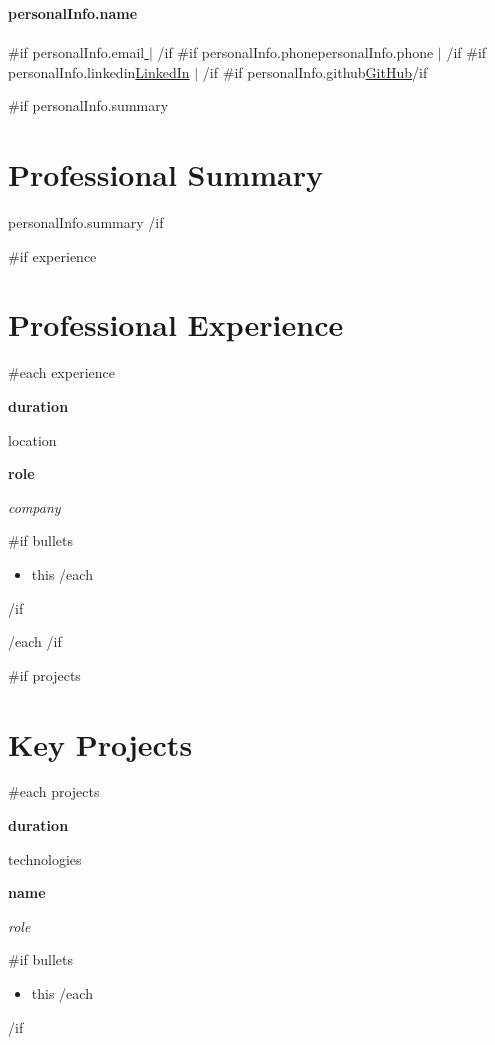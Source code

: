 \documentclass[11pt, a4paper]{article}
\newcommand{\timelineEntry}[4]{
    \noindent
    \begin{minipage}[t]{0.18\textwidth}
        \vspace{0pt} %
        \textcolor{secondary}{\small\textbf{#1}}\par
        \vspace{2pt}
        \textcolor{secondary}{\footnotesize #2}
    \end{minipage}%
    \hfill
    \begin{minipage}[t]{0.79\textwidth}
        \vspace{0pt}
        \textbf{\large\color{primary}#3}\par
        \vspace{2pt}
        \textit{\color{secondary}#4}\par
    \end{minipage}
}
\begin{document}
\pagestyle{empty}

\begin{center}
    {\Huge \bfseries \color{primary} {{{personalInfo.name}}} }\\[6pt]
    \textcolor{secondary}{\large }\\[6pt]
    \small
    {{#if personalInfo.email}}\href{mailto:{{{personalInfo.email}}} }{ } $\vert$ {{/if}}
    {{#if personalInfo.phone}}{{{personalInfo.phone}}} $\vert$ {{/if}}
    {{#if personalInfo.linkedin}}\href{ {{{personalInfo.linkedin}}} }{\color{accent}LinkedIn} $\vert$ {{/if}}
    {{#if personalInfo.github}}\href{ {{{personalInfo.github}}} }{\color{accent}GitHub}{{/if}}
\end{center}

\vspace{12pt}

{{#if personalInfo.summary}}
\section*{Professional Summary}
\noindent
\textcolor{primary}{ {{{personalInfo.summary}}} }
{{/if}}

{{#if experience}}
\section*{Professional Experience}

{{#each experience}}
\timelineEntry{ {{{duration}}} }{ {{{location}}} }
{ {{{role}}} }{ {{{company}}} }
{{#if bullets}}
\vspace{-6pt}
\hfill
\begin{minipage}[t]{0.79\textwidth}
\begin{itemize}[leftmargin=1.2em, noitemsep, topsep=0pt]
{{#each bullets}}
    \item {{{this}}}
{{/each}}
\end{itemize}
\end{minipage}
{{/if}}
\par\vspace{10pt}

{{/each}}
{{/if}}

{{#if projects}}
\section*{Key Projects}

{{#each projects}}
\timelineEntry{ {{{duration}}} }{ {{{technologies}}} }
{ {{{name}}} }{ {{{role}}} }
{{#if bullets}}
\vspace{-6pt}
\hfill
\begin{minipage}[t]{0.79\textwidth}
\begin{itemize}[leftmargin=1.2em, noitemsep, topsep=0pt]
{{#each bullets}}
    \item {{{this}}}
{{/each}}
\end{itemize}
\end{minipage}
{{/if}}
\par\vspace{10pt}
\end{document}
